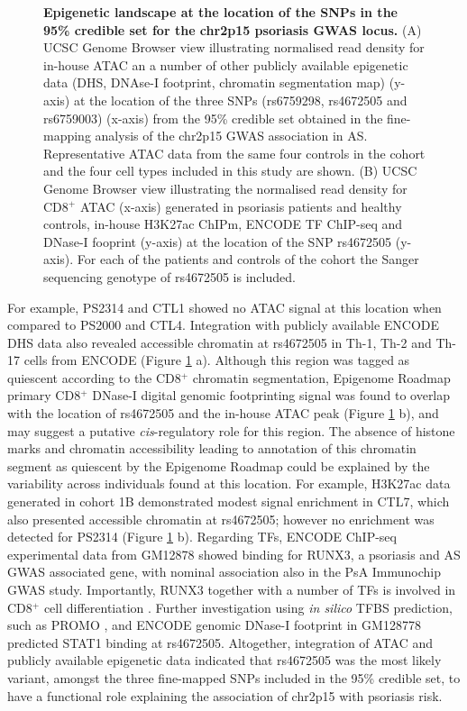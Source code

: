 \begin{figure}[htbp]
\caption[Epigenetic landscape at the location of the SNPs in the 95\% credible set for the chr2p15 psoriasis GWAS locus.]{\textbf{Epigenetic landscape at the location of the SNPs in the 95\% credible set for the chr2p15 psoriasis GWAS locus.} (A) UCSC Genome Browser view illustrating normalised read density for in-house ATAC an a number of other publicly available epigenetic data (DHS, DNAse-I footprint, chromatin segmentation map) (y-axis) at the location of the three SNPs (rs6759298, rs4672505 and rs6759003) (x-axis) from the 95\% credible set obtained in the fine-mapping analysis of the chr2p15 GWAS association in AS. Representative ATAC data from the same four controls in the cohort and the four cell types included in this study are shown. (B) UCSC Genome Browser view illustrating the normalised read density for CD8$^+$ ATAC (x-axis) generated in psoriasis patients and healthy controls, in-house H3K27ac ChIPm, ENCODE TF ChIP-seq and DNase-I fooprint (y-axis) at the location of the SNP rs4672505 (y-axis). For each of the patients and controls of the cohort the Sanger sequencing genotype of rs4672505 is included.}
\label{figure:ATAC_PS_CTL_chr2p15_rs4672505}
\end{figure} 


For example, PS2314 and CTL1 showed no ATAC signal at this location when compared to PS2000 and CTL4. Integration with publicly available ENCODE DHS data also revealed accessible chromatin at rs4672505 in Th-1, Th-2 and Th-17 cells from ENCODE (Figure \ref{figure:ATAC_PS_CTL_chr2p15_rs4672505} a). Although this region was tagged as quiescent according to the CD8$^+$ chromatin segmentation, Epigenome Roadmap primary CD8$^+$ DNase-I digital genomic footprinting signal was found to overlap with the location of rs4672505 and the in-house ATAC peak (Figure \ref{figure:ATAC_PS_CTL_chr2p15_rs4672505} b), and may suggest a putative \textit{cis}-regulatory role for this region. The absence of histone marks and chromatin accessibility leading to annotation of this chromatin segment as quiescent by the Epigenome Roadmap could be explained by the variability across individuals found at this location. For example, H3K27ac data generated in cohort 1B demonstrated modest signal enrichment in CTL7, which also presented accessible chromatin at rs4672505; however no enrichment was detected for PS2314 (Figure \ref{figure:ATAC_PS_CTL_chr2p15_rs4672505} b). Regarding TFs, ENCODE ChIP-seq experimental data from GM12878 showed binding for RUNX3, a psoriasis and AS GWAS associated gene, with nominal association also in the PsA Immunochip GWAS study. Importantly, RUNX3 together with a number of TFs is involved in CD8$^+$ cell differentiation \parencite{Wong2011}. Further investigation using \textit{in silico} TFBS prediction, such as PROMO \parencite{Messeguer2002}, and ENCODE genomic DNase-I footprint in GM128778 predicted STAT1 binding at rs4672505. Altogether, integration of ATAC and publicly available epigenetic data indicated that rs4672505 was the most likely variant, amongst the three fine-mapped SNPs included in the 95\% credible set, to have a functional role explaining the association of chr2p15 with psoriasis risk.

